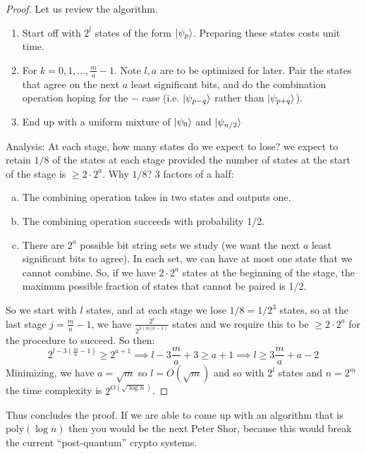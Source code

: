 \begin{proof}
Let us review the algorithm.
\begin{enumerate}
    \item Start off with $2^l$ states of the form $\lvert \psi_p \rangle$. Preparing these states costs unit time.
    \item For $k = 0, 1, \ldots, \frac{m}{a} - 1$. Note $l, a$ are to be optimized for later. Pair the states that agree on the next $a$ least significant bits, and do the combination operation hoping for the $-$ case (i.e. $\lvert \psi_{p-q} \rangle$ rather than $\lvert \psi_{p+q} \rangle$).
    \item End up with a uniform mixture of $\lvert \psi_0 \rangle$ and $\lvert \psi_{n/2} \rangle$
\end{enumerate}
Analysis: At each stage, how many states do we expect to lose? we expect to retain $1/8$ of the states at each stage provided the number of states at the start of the stage is $\geq 2\cdot 2^{a}$. Why $1/8$? 3 factors of a half:
\begin{enumerate}[(a)]
    \item The combining operation takes in two states and outputs one.
    \item The combining operation succeeds with probability 1/2.
    \item There are $2^a$ possible bit string sets we study (we want the next $a$ least significant bits to agree). In each set, we can have at most one state that we cannot combine. So, if we have $2 \cdot 2^a$ states at the beginning of the stage, the maximum possible fraction of states that cannot be paired is 1/2.
\end{enumerate}
So we start with $l$ states, and at each stage we lose $1/8 = 1/2^{3}$ states, so at the last stage $j = \frac{m}{a} - 1$, we have $\frac{2^l}{2^{3(m/a-1)}}$ states and we require this to be $\geq 2 \cdot 2^a$ for the procedure to succeed. So then:
\begin{equation}
    2^{l - 3(\frac{m}{a}-1)} \geq 2^{a+1} \implies l - 3\frac{m}{a} + 3 \geq a + 1 \implies l \geq 3\frac{m}{a} + a - 2
\end{equation}
Minimizing, we have $a = \sqrt{m}$ so $l = O(\sqrt{m})$ and so with $2^l$ states and $n = 2^m$ the time complexity is $2^{O(\sqrt{\log n})}$. 
\end{proof}
Thus concludes the proof. If we are able to come up with an algorithm that is $\text{poly}(\log n)$ then you would be the next Peter Shor, because this would break the current ``post-quantum'' crypto systems.

